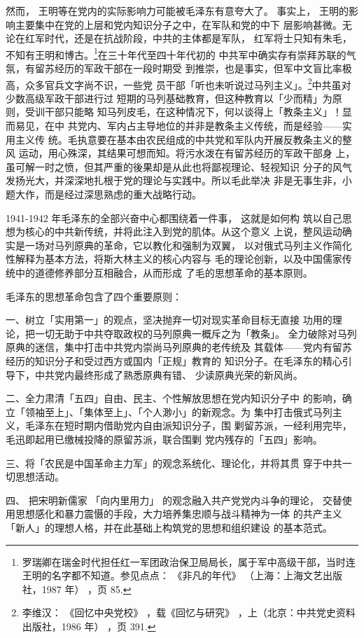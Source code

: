 然而，
王明等在党内的实际影响力可能被毛泽东有意夸大了。
事实上，
王明的影响主要集中在党的上层和党内知识分子之中，在军队和党的中下
层影响甚微。无论在红军时代，还是在抗战阶段，中共的主体都是军队，
红军将士只知有朱毛，不知有王明和博古。\footnote{罗瑞卿在瑞金时代担任红一军团政治保卫局局长，属于军中高级干部，当时连王明的名字都不知道。参见点点：
《非凡的年代》
（上海：上海文艺出版社，1987 年）
，页 85.}在三十年代至四十年代初的
中共军中确实存有崇拜苏联的气氛，有留苏经历的军政干部在一段时期受
到推崇，也是事实，但军中文盲比率极高，众多官兵文字尚不识，一些党
员干部「听也未听说过马列主义」。\footnote{李维汉：
《回忆中央党校》
，载《回忆与研究》
，上（北京：中共党史资料出版社，1986 年）
，页 391.}中共虽对少数高级军政干部进行过
短期的马列基础教育，但这种教育以「少而精」为原则，受训干部只能略
知马列皮毛，在这种情况下，何以谈得上「教条主义」！显而易见，在中
共党内、军内占主导地位的并非是教条主义传统，而是经验——实用主义传
统。毛执意要在基本由农民组成的中共党和军队内开展反教条主义的整风
运动，用心殊深，其结果可想而知。将污水泼在有留苏经历的军政干部身
上，虽可解一时之愤，但其严重的後果却是从此也将鄙视理论、轻视知识
分子的风气发扬光大，并深深地扎根于党的理论与实践中。所以毛此举决
非是无事生非，小题大作，而是经过深思熟虑的重大战略行动。

1941-1942 年毛泽东的全部兴奋中心都围绕着一件事，
这就是如何构
筑以自己思想为核心的中共新传统，并将此注入到党的肌体。从这个意义
上说，整风运动确实是一场对马列原典的革命，它以教化和强制为双翼，
以对俄式马列主义作简化性解释为基本方法，将斯大林主义的核心内容与
毛的理论创新，以及中国儒家传统中的道德修养部分互相融合，从而形成
了毛的思想革命的基本原则。

毛泽东的思想革命包含了四个重要原则：

一、树立「实用第一」的观点，坚决抛弃一切对现实革命目标无直接
功用的理论，把一切无助于中共夺取政权的马列原典一概斥之为「教条」。
全力破除对马列原典的迷信，集中打击中共党内崇尚马列原典的老传统及
其载体——党内有留苏经历的知识分子和受过西方或国内「正规」教育的
知识分子。在毛泽东的精心引导下，中共党内最终形成了熟悉原典有错、
少读原典光荣的新风尚。

二、全力肃清「五四」自由、民主、个性解放思想在党内知识分子中
的影响，确立「领袖至上」、「集体至上」、「个人渺小」的新观念。为
集中打击俄式马列主义，毛泽东在短时期内借助党内自由派知识分子，围
剿留苏派，一经利用完毕，毛迅即起用已缴械投降的原留苏派，联合围剿
党内残存的「五四」影响。

三、将「农民是中国革命主力军」的观念系统化、理论化，并将其贯
穿于中共一切思想活动。

四、
把宋明新儒家
「向内里用力」
的观念融入共产党党内斗争的理论，
交替使用思想感化和暴力震慑的手段，大力培养集忠顺与战斗精神为一体
的共产主义「新人」的理想人格，并在此基础上构筑党的思想和组织建设
的基本范式。

